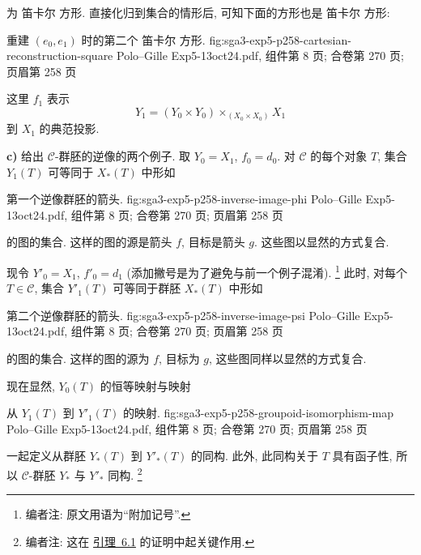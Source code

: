\noindent 为 笛卡尔 方形. 直接化归到集合的情形后,
可知下面的方形也是 笛卡尔 方形:

  {重建 \((e_0,e_1)\) 时的第二个 笛卡尔 方形.}
  {fig:sga3-exp5-p258-cartesian-reconstruction-square}
  {Polo--Gille Exp5-13oct24.pdf, 组件第 8 页; 合卷第 270 页; 页眉第 258 页}

这里 \(f_1\) 表示
\[
  Y_1=(Y_0\times Y_0)\times_{(X_0\times X_0)}X_1
\]
到 \(X_1\) 的典范投影.

\medskip
{}\label{par:sga3-V-3-c}%
\noindent\textbf{c)} 给出 \(\mathscr C\)-群胚的逆像的两个例子.
取 \(Y_0=X_1\), \(f_0=d_0\).
对 \(\mathscr C\) 的每个对象 \(T\), 集合 \(Y_1(T)\)
可等同于 \(X_\ast(T)\) 中形如

  {第一个逆像群胚的箭头.}
  {fig:sga3-exp5-p258-inverse-image-phi}
  {Polo--Gille Exp5-13oct24.pdf, 组件第 8 页; 合卷第 270 页; 页眉第 258 页}

\noindent 的图的集合. 这样的图的源是箭头 \(f\), 目标是箭头 \(g\).
这些图以显然的方式复合.

现令 \(Y'_0=X_1\), \(f'_0=d_1\)
(添加撇号是为了避免与前一个例子混淆).%
\footnote{\label{note:sga3-V-12}编者注: 原文用语为``附加记号''.}
此时, 对每个 \(T\in\mathscr C\), 集合 \(Y'_1(T)\)
可等同于群胚 \(X_\ast(T)\) 中形如

  {第二个逆像群胚的箭头.}
  {fig:sga3-exp5-p258-inverse-image-psi}
  {Polo--Gille Exp5-13oct24.pdf, 组件第 8 页; 合卷第 270 页; 页眉第 258 页}

\noindent 的图的集合. 这样的图的源为 \(f\), 目标为 \(g\),
这些图同样以显然的方式复合.

现在显然, \(Y_0(T)\) 的恒等映射与映射

  {从 \(Y_1(T)\) 到 \(Y'_1(T)\) 的映射.}
  {fig:sga3-exp5-p258-groupoid-isomorphism-map}
  {Polo--Gille Exp5-13oct24.pdf, 组件第 8 页; 合卷第 270 页; 页眉第 258 页}

\noindent 一起定义从群胚 \(Y_\ast(T)\) 到 \(Y'_\ast(T)\) 的同构.
此外, 此同构关于 \(T\) 具有函子性,
所以 \(\mathscr C\)-群胚 \(Y_\ast\) 与 \(Y'_\ast\) 同构.%
\footnote{\label{note:sga3-V-13}编者注:
这在 \hyperref[lem:sga3-V-6.1]{引理~6.1} 的证明中起关键作用.}


